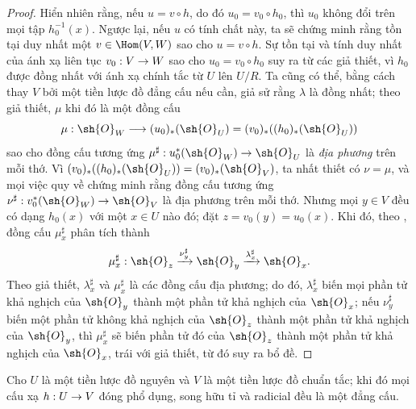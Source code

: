 \documentclass[oneside,10pt]{amsart}
\makeatletter
\newcommand{\ega@arrow}[2]{\mathchoice{#1}{#2}{#2}{#2}}
\renewcommand{\to}{\ega@arrow{\longrightarrow}{\rightarrow}}
\let\EGAOriginalLabel\label
\renewcommand{\label}[1]{\phantomsection\EGAOriginalLabel{#1}}
\makeatother
\begin{document}
\begin{proof}
Hiển nhiên rằng, nếu $u=v\circ h$, do đó $u_0=v_0\circ h_0$, thì $u_0$ không đổi trên mọi tập $h_0^{-1}(x)$.
Ngược lại, nếu $u$ có tính chất này, ta sẽ chứng minh rằng tồn tại duy nhất một $v\in\Hom(V,W)$ sao cho $u=v\circ h$.
Sự tồn tại và tính duy nhất của ánh xạ liên tục $v_0:V\to W$ sao cho $u_0=v_0\circ h_0$ suy ra từ các giả thiết, vì $h_0$ được đồng nhất với ánh xạ chính tắc từ $U$ lên $U/R$.
Ta cũng có thể, bằng cách thay $V$ bởi một tiền lược đồ đẳng cấu nếu cần, giả sử rằng $\lambda$ là đồng nhất;
theo giả thiết, $\mu$ khi đó là một đồng cấu
\[
    \mu:\sh{O}_W\longrightarrow(u_0)_*(\sh{O}_U)
    =(v_0)_*((h_0)_*(\sh{O}_U))
\]
sao cho đồng cấu tương ứng $\mu^\sharp:u_0^*(\sh{O}_W)\to\sh{O}_U$ là \emph{địa phương} trên mỗi thớ.
Vì $(v_0)_*((h_0)_*(\sh{O}_U))=(v_0)_*(\sh{O}_V)$, ta nhất thiết có $\nu=\mu$, và mọi việc quy về chứng minh rằng đồng cấu tương ứng $\nu^\sharp:v_0^*(\sh{O}_W)\to\sh{O}_V$ là địa phương trên mỗi thớ.
Nhưng mọi $y\in V$ đều có dạng $h_0(x)$ với một $x\in U$ nào đó;
đặt $z=v_0(y)=u_0(x)$.
Khi đó, theo , đồng cấu $\mu_x^\sharp$ phân tích thành
\[
    \mu_x^\sharp:\sh{O}_z
    \xrightarrow{\nu_y^\sharp}\sh{O}_y
    \xrightarrow{\lambda_x^\sharp}\sh{O}_x.
\]
Theo giả thiết, $\lambda_x^\sharp$ và $\mu_x^\sharp$ là các đồng cấu địa phương;
do đó, $\lambda_x^\sharp$ biến mọi phần tử khả nghịch của $\sh{O}_y$ thành một phần tử khả nghịch của $\sh{O}_x$;
nếu $\nu_y^\sharp$ biến một phần tử không khả nghịch của $\sh{O}_z$ thành một phần tử khả nghịch của $\sh{O}_y$, thì $\mu_x^\sharp$ sẽ biến phần tử đó của $\sh{O}_z$ thành một phần tử khả nghịch của $\sh{O}_x$, trái với giả thiết, từ đó suy ra bổ đề.
\end{proof}

\begin{corollary}[8.11.2]
\label{II.8.11.2}
Cho $U$ là một tiền lược đồ nguyên và $V$ là một tiền lược đồ chuẩn tắc;
khi đó mọi cấu xạ $h:U\to V$ đóng phổ dụng, song hữu tỉ và radicial đều là một đẳng cấu.
\end{corollary}
\end{document}
